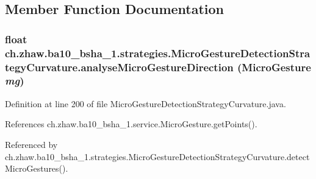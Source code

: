 \subsection{Member Function Documentation}
\hypertarget{classch_1_1zhaw_1_1ba10__bsha__1_1_1strategies_1_1MicroGestureDetectionStrategyCurvature_a7d6da421d9cd91b8eccad94f0755a0f0}{
\subsubsection[{analyseMicroGestureDirection}]{\setlength{\rightskip}{0pt plus 5cm}float ch.zhaw.ba10\_\-bsha\_\-1.strategies.MicroGestureDetectionStrategyCurvature.analyseMicroGestureDirection ({\bf MicroGesture} {\em mg})}}
\label{classch_1_1zhaw_1_1ba10__bsha__1_1_1strategies_1_1MicroGestureDetectionStrategyCurvature_a7d6da421d9cd91b8eccad94f0755a0f0}


Definition at line 200 of file MicroGestureDetectionStrategyCurvature.java.

References ch.zhaw.ba10\_\-bsha\_\-1.service.MicroGesture.getPoints().

Referenced by ch.zhaw.ba10\_\-bsha\_\-1.strategies.MicroGestureDetectionStrategyCurvature.detectMicroGestures().

